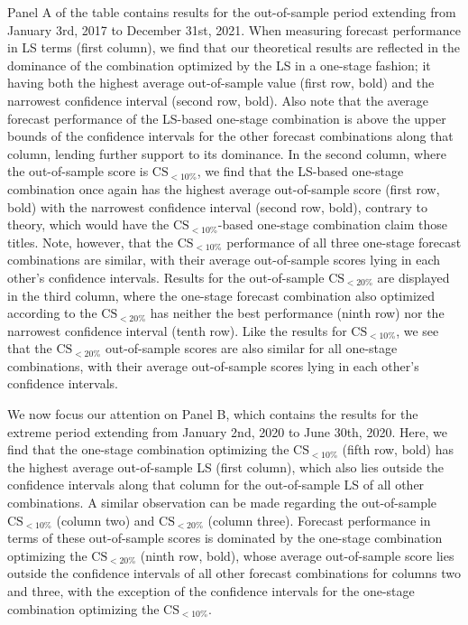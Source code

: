 \documentclass[12pt]{article}
\theoremstyle{definition}
\theoremstyle{remark}
\begin{document}
Panel A of the table contains results for the out-of-sample period extending from January 3rd, 2017 to December 31st, 2021. When measuring forecast performance in LS terms (first column), we find that our theoretical results are reflected in the dominance of the combination optimized by the LS in a one-stage fashion; it having both the highest average out-of-sample value (first row, bold) and the narrowest confidence interval (second row, bold). Also note that the average forecast performance of the LS-based one-stage combination is above the upper bounds of the confidence intervals for the other forecast combinations along that column, lending further support to its dominance. In the second column, where the out-of-sample score is $\mathrm{CS}_{<10\%}$, we find that the LS-based one-stage combination once again has the highest average out-of-sample score (first row, bold) with the narrowest confidence interval (second row, bold), contrary to theory, which would have the $\mathrm{CS}_{<10\%}$-based one-stage combination claim those titles. Note, however, that the $\mathrm{CS}_{<10\%}$ performance of all three one-stage forecast combinations are similar, with their average out-of-sample scores lying in each other's confidence intervals. Results for the out-of-sample $\mathrm{CS}_{<20\%}$ are displayed in the third column, where the one-stage forecast combination also optimized according to the $\mathrm{CS}_{<20\%}$ has neither the best performance (ninth row) nor the narrowest confidence interval (tenth row). Like the results for $\mathrm{CS}_{<10\%}$, we see that the $\mathrm{CS}_{<20\%}$ out-of-sample scores are also similar for all one-stage combinations, with their average out-of-sample scores lying in each other's confidence intervals.

We now focus our attention on Panel B, which contains the results for the extreme period extending from January 2nd, 2020 to June 30th, 2020. Here, we find that the one-stage combination optimizing the $\mathrm{CS}_{<10\%}$ (fifth row, bold) has the highest average out-of-sample LS (first column), which also lies outside the confidence intervals along that column for the out-of-sample LS of all other combinations. A similar observation can be made regarding the out-of-sample $\mathrm{CS}_{<10\%}$ (column two) and $\mathrm{CS}_{<20\%}$ (column three). Forecast performance in terms of these out-of-sample scores is dominated by the one-stage combination optimizing the $\mathrm{CS}_{<20\%}$ (ninth row, bold), whose average out-of-sample score lies outside the confidence intervals of all other forecast combinations for columns two and three, with the exception of the confidence intervals for the one-stage combination optimizing the $\mathrm{CS}_{<10\%}$.
\end{document}
